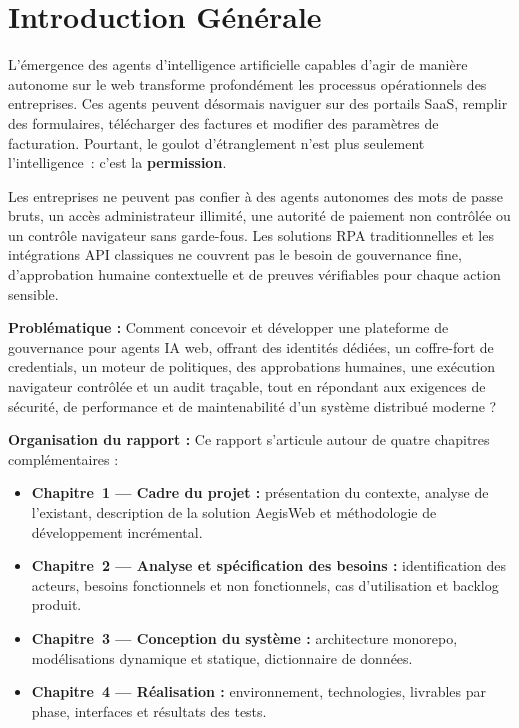 \documentclass[12pt,a4paper,oneside]{report}
\begin{document}
\cleardoublepage
{}
\setcounter{page}{1}

\clearpage
\chapter*{Introduction Générale}

\begin{chapintro}
L'émergence des agents d'intelligence artificielle capables d'agir de
manière autonome sur le web transforme profondément les processus
opérationnels des entreprises. Ces agents peuvent désormais naviguer sur
des portails SaaS, remplir des formulaires, télécharger des factures et
modifier des paramètres de facturation. Pourtant, le goulot d'étranglement
n'est plus seulement l'intelligence~: c'est la \textbf{permission}.
\end{chapintro}

Les entreprises ne peuvent pas confier à des agents autonomes des mots de
passe bruts, un accès administrateur illimité, une autorité de paiement
non contrôlée ou un contrôle navigateur sans garde-fous. Les solutions
RPA traditionnelles et les intégrations API classiques ne couvrent pas le
besoin de gouvernance fine, d'approbation humaine contextuelle et de
preuves vérifiables pour chaque action sensible.

\medskip
\noindent\textbf{Problématique :} Comment concevoir et développer une
plateforme de gouvernance pour agents IA web, offrant des identités
dédiées, un coffre-fort de credentials, un moteur de politiques, des
approbations humaines, une exécution navigateur contrôlée et un audit
traçable, tout en répondant aux exigences de sécurité, de performance et
de maintenabilité d'un système distribué moderne ?

\medskip
\noindent\textbf{Organisation du rapport :} Ce rapport s'articule autour
de quatre chapitres complémentaires :

\begin{itemize}[leftmargin=2cm, itemsep=3pt]
  \item \textbf{Chapitre~1 — Cadre du projet :} présentation du contexte,
    analyse de l'existant, description de la solution AegisWeb et
    méthodologie de développement incrémental.
  \item \textbf{Chapitre~2 — Analyse et spécification des besoins :}
    identification des acteurs, besoins fonctionnels et non
    fonctionnels, cas d'utilisation et backlog produit.
  \item \textbf{Chapitre~3 — Conception du système :} architecture
    monorepo, modélisations dynamique et statique, dictionnaire de
    données.
  \item \textbf{Chapitre~4 — Réalisation :} environnement, technologies,
    livrables par phase, interfaces et résultats des tests.
\end{itemize}







\end{document}
